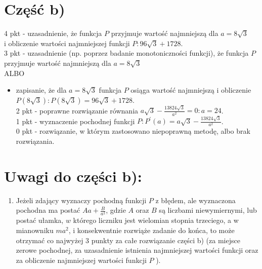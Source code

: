 \documentclass[10pt]{article}
\begin{document}
\section*{Część b)}
4 pkt - uzasadnienie, że funkcja $P$ przyjmuje wartość najmniejszą dla $a=8 \sqrt{3}$\\
i obliczenie wartości najmniejszej funkcji $P: 96 \sqrt{3}+1728$.\\
3 pkt - uzasadnienie (np. poprzez badanie monotoniczności funkcji), że funkcja $P$ przyjmuje wartość najmniejszą dla $a=8 \sqrt{3}$\\
ALBO

\begin{itemize}
  \item zapisanie, że dla $a=8 \sqrt{3}$ funkcja $P$ osiąga wartość najmniejszą i obliczenie\\
$P(8 \sqrt{3}): P(8 \sqrt{3})=96 \sqrt{3}+1728$.\\
2 pkt - poprawne rozwiązanie równania $a \sqrt{3}-\frac{13824 \sqrt{3}}{a^{2}}=0: a=24$.\\
1 pkt - wyznaczenie pochodnej funkcji $P: P^{\prime}(a)=a \sqrt{3}-\frac{13824 \sqrt{3}}{a^{2}}$.\\
0 pkt - rozwiązanie, w którym zastosowano niepoprawną metodę, albo brak rozwiązania.
\end{itemize}

\section*{Uwagi do części b):}
\begin{enumerate}
  \item Jeżeli zdający wyznaczy pochodną funkcji $P$ z błędem, ale wyznaczona pochodna ma postać $A a+\frac{B}{a^{2}}$, gdzie $A$ oraz $B$ są liczbami niewymiernymi, lub postać ułamka, $w$ którego liczniku jest wielomian stopnia trzeciego, a w mianowniku $m a^{2}$, i konsekwentnie rozwiąże zadanie do końca, to może otrzymać co najwyżej 3 punkty za całe rozwiązanie części b) (za miejsce zerowe pochodnej, za uzasadnienie istnienia najmniejszej wartości funkcji oraz za obliczenie najmniejszej wartości funkcji $P$ ).
\end{enumerate}
\end{document}
